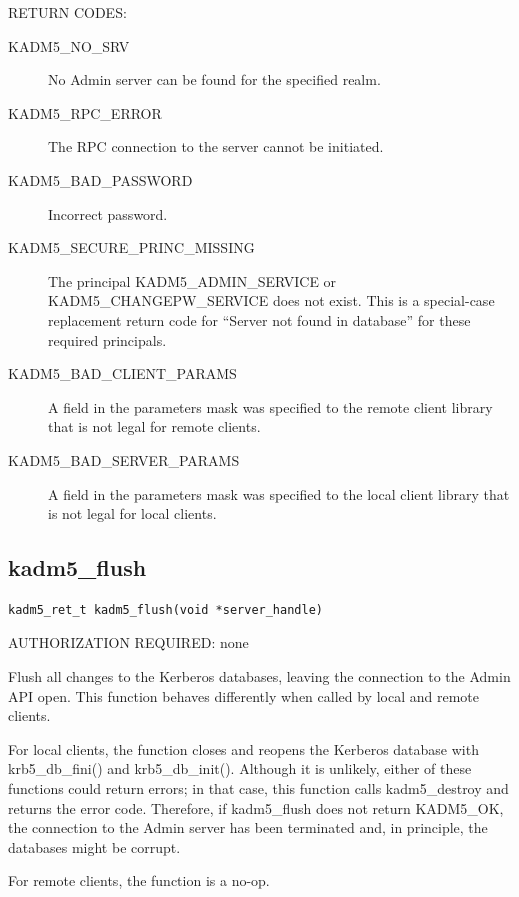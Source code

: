 RETURN CODES:

\begin{description}
\item[KADM5_NO_SRV] No Admin server can be found for the
specified realm.

\item[KADM5_RPC_ERROR] The RPC connection to the server cannot be
initiated.

\item[KADM5_BAD_PASSWORD] Incorrect password.

\item[KADM5_SECURE_PRINC_MISSING] The principal
KADM5_ADMIN_SERVICE or KADM5_CHANGEPW_SERVICE does not
exist.  This is a special-case replacement return code for ``Server
not found in database'' for these required principals.

\item[KADM5_BAD_CLIENT_PARAMS] A field in the parameters mask was
specified to the remote client library that is not legal for remote
clients.

\item[KADM5_BAD_SERVER_PARAMS] A field in the parameters mask was
specified to the local client library that is not legal for local
clients.
\end{description}

\subsection{kadm5_flush}

\begin{verbatim}
kadm5_ret_t kadm5_flush(void *server_handle)
\end{verbatim}

AUTHORIZATION REQUIRED: none

Flush all changes to the Kerberos databases, leaving the connection to
the Admin API open.  This function behaves differently when called by
local and remote clients.

For local clients, the function closes and reopens the Kerberos
database with krb5_db_fini() and krb5_db_init().
Although it is unlikely, either of these functions
could return errors; in that case, this function calls
kadm5_destroy and returns the error code.  Therefore, if
kadm5_flush does not return KADM5_OK, the connection to the
Admin server has been terminated and, in principle, the databases
might be corrupt.

For remote clients, the function is a no-op.

